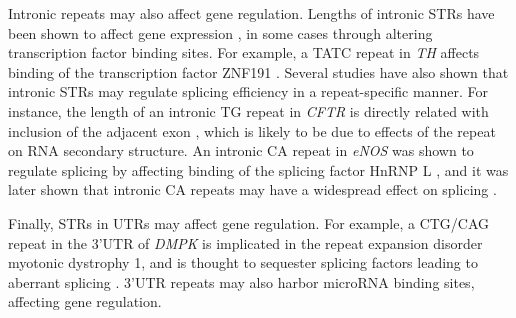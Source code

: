 Intronic repeats may also affect gene regulation. Lengths of intronic STRs have been shown to affect gene expression \cite{GebhardtZankerBrandt1999}, in some cases through altering transcription factor binding sites. For example, a TATC repeat in \emph{TH} affects binding of the transcription factor ZNF191 \cite{AlbaneseBiguetKieferEtAl2001}. Several studies have also shown that intronic STRs may regulate splicing efficiency in a repeat-specific manner. For instance, the length of an intronic TG repeat in \emph{CFTR} is directly related with inclusion of the adjacent exon \cite{HefferonGromanYurkEtAl2004}, which is likely to be due to effects of the repeat on RNA secondary structure. An intronic CA repeat in \emph{eNOS} was shown to regulate splicing by affecting binding of the splicing factor HnRNP L \cite{HuiStanglLaneEtAl2003}, and it was later shown that intronic CA repeats may have a widespread effect on splicing \cite{HuiHungHeinerEtAl2005}.

Finally, STRs in UTRs may affect gene regulation. For example, a CTG/CAG repeat in the 3'UTR of \emph{DMPK} is implicated in the repeat expansion disorder myotonic dystrophy 1, and is thought to sequester splicing factors leading to aberrant splicing \cite{KoscianskaWitkosKozlowskaEtAl2015}. 3'UTR repeats may also harbor microRNA binding sites, affecting gene regulation.

